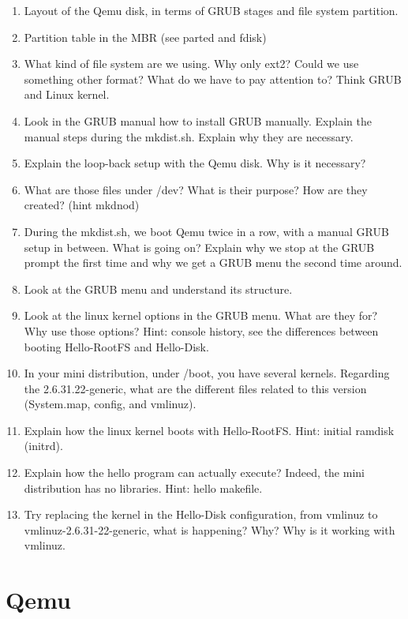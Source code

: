 \documentclass[10]{article}
\begin{document}
\begin{enumerate}
\item
Layout of the Qemu disk, in terms of GRUB stages and file system partition.
\item
Partition table in the MBR (see parted and fdisk)
\item 
What kind of file system are we using.
Why only ext2? Could we use something other format?
What do we have to pay attention to? Think GRUB
and Linux kernel.
\item
Look in the GRUB manual how to install GRUB manually.
Explain the manual steps during the mkdist.sh.
Explain why they are necessary. 
\item
Explain the loop-back setup with the Qemu disk.
Why is it necessary? 
\item 
What are those files under /dev?
What is their purpose? How are they created? (hint mkdnod)
\item 
During the mkdist.sh, we boot Qemu twice in a row, 
with a manual GRUB setup in between.
What is going on? 
Explain why we stop at the GRUB prompt the first time
and why we get a GRUB menu the second time around.
\item 
Look at the GRUB menu and understand its structure.
\item 
Look at the linux kernel options in the GRUB menu.
What are they for? Why use those options?
Hint: console history, see the differences between
booting Hello-RootFS and Hello-Disk.
\item
In your mini distribution, under /boot, you have
several kernels. Regarding the 2.6.31.22-generic,
what are the different files related to this version
(System.map, config, and vmlinuz).
\item
Explain how the linux kernel boots with Hello-RootFS.
Hint: initial ramdisk (initrd).
\item
Explain how the hello program can actually execute?
Indeed, the mini distribution has no libraries.
Hint: hello makefile.
\item 
Try replacing the kernel in the Hello-Disk configuration,
from vmlinuz to vmlinuz-2.6.31-22-generic, what is happening?
Why? Why is it working with vmlinuz.

\end{enumerate}



\section{Qemu}
\end{document}

